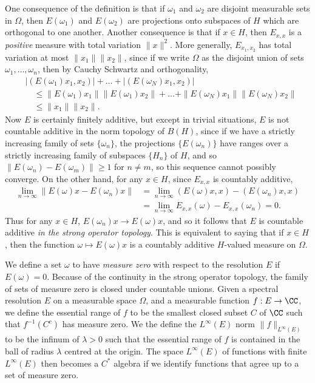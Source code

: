 One consequence of the definition is that if $\omega_1$ and $\omega_2$ are disjoint measurable sets in $\Omega$, then $E(\omega_1)$ and $E(\omega_2)$ are projections onto subspaces of $H$ which are orthogonal to one another. Another consequence is that if $x \in H$, then $E_{x,x}$ is a \emph{positive} measure with total variation $\| x \|^2$. More generally, $E_{x_1,x_2}$ has total variation at most $\| x_1 \| \| x_2 \|$, since if we write $\Omega$ as the disjoint union of sets $\omega_1, \dots, \omega_n$, then by Cauchy Schwartz and orthogonality,
%
\begin{align*}
    &|(E(\omega_1) x_1, x_2)| + \dots + |(E(\omega_N) x_1, x_2)|\\
    &\quad\leq \| E(\omega_1) x_1 \| \| E(\omega_1) x_2 \| + \dots + \| E(\omega_N) x_1 \| \| E(\omega_N) x_2 \| \\
        &\quad\leq \| x_1 \| \| x_2 \|.
\end{align*}
%
Now $E$ is certainly finitely additive, but except in trivial situations, $E$ is not countable additive in the norm topology of $B(H)$, since if we have a strictly increasing family of sets $\{ \omega_n \}$, the projections $\{ E(\omega_n) \}$ have ranges over a strictly increasing family of subspaces $\{ H_n \}$ of $H$, and so $\| E(\omega_n) - E(\omega_m) \| \geq 1$ for $n \neq m$, so this sequence cannot possibly converge. On the other hand, for any $x \in H$, since $E_{x,x}$ is countably additive,
%
\begin{align*}
    \lim_{n \to \infty} \| E(\omega) x - E(\omega_n) x \| &= \lim_{n \to \infty} (E(\omega) x, x) - (E(\omega_n) x, x)\\
    &= \lim_{n \to \infty} E_{x,x}(\omega) - E_{x,x}(\omega_n) = 0.
\end{align*}
%
Thus for any $x \in H$, $E(\omega_n) x \to E(\omega) x$, and so it follows that $E$ is countable additive \emph{in the strong operator topology}. This is equivalent to saying that if $x \in H$, then the function $\omega \mapsto E(\omega) x$ is a countably additive $H$-valued measure on $\Omega$.

We define a set $\omega$ to have \emph{measure zero} with respect to the resolution $E$ if $E(\omega) = 0$. Because of the continuity in the strong operator topology, the family of sets of measure zero is closed under countable unions. Given a spectral resolution $E$ on a measurable space $\Omega$, and a measurable function $f: E \to \CC$, we define the essential range of $f$ to be the smallest closed subset $C$ of $\CC$ such that $f^{-1}(C^c)$ has measure zero. We the define the $L^\infty(E)$ norm $\| f \|_{L^\infty(E)}$ to be the infinum of $\lambda > 0$ such that the essential range of $f$ is contained in the ball of radius $\lambda$ centred at the origin. The space $L^\infty(E)$ of functions with finite $L^\infty(E)$ then becomes a $C^*$ algebra if we identify functions that agree up to a set of measure zero.

